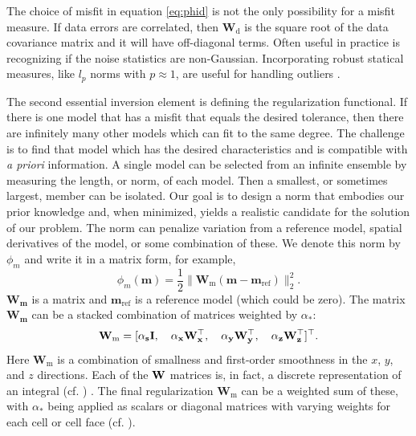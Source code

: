 \documentclass[preprint,review,3p,times,onecolumn,authoryear]{elsarticle}
\newcommand{\m}{\mathbf{m}}
\newcommand{\mref}{\mathbf{m}_\text{ref}}
\newcommand{\Wd}{\mathbf{W}_\text{d}}
\newcommand{\Wm}{\mathbf{W}_\text{m}}
\begin{document}
The choice of misfit in equation \ref{eq:phid} is not the only possibility for a misfit measure.
If data errors are correlated, then $\Wd$ is the square root of the data covariance
matrix and it will have off-diagonal terms. Often useful in practice is recognizing
if the noise statistics are non-Gaussian. Incorporating robust statical measures,
like $l_p$ norms with $p\approx1$, are useful for handling outliers \citep{ekblom1973calculation,Farquharson1998}.

\bigskip

The second essential inversion element is defining the regularization functional.
If there is one model that has a misfit that equals the desired tolerance,
then there are infinitely many other models which can fit to the same
degree. The challenge is to find that model which has the desired characteristics
and is compatible with \emph{a priori} information. A single model can be selected
from an infinite ensemble by measuring the length, or norm, of each model.
Then a smallest, or sometimes largest, member can be isolated. Our goal is to design a norm
that embodies our prior knowledge and, when minimized,
yields a realistic candidate for the solution of our problem. The norm can
penalize variation from a reference model, spatial derivatives of the model, or
some combination of these.
We denote this norm by $\phi_m$ and write it in a matrix form, for example,
{%
\begin{equation}
\label{eq:phim}
\phi_m(\m)= \frac{1}{2}\|\Wm(\m-\mref)\|^2_2.
\end{equation}
}
$\mathbf{W_m}$ is a matrix and $\mref$ is a reference model (which could be zero).
The matrix $\mathbf{W_m}$ can be a stacked combination of matrices weighted by $\alpha_*$:
{%
\begin{equation}
\label{eq:Wm}
    \bf \Wm = [\alpha_s I, \quad \alpha_x W_x^\top, \quad \alpha_y W_y^\top, \quad \alpha_z W_z^\top]^\top.
\end{equation}
}
Here $\Wm$ is a combination of smallness and first-order smoothness in the $x$, $y$, and $z$ directions.
Each of the $\bf W$ matrices is, in fact, a discrete representation of an integral (cf. \cite{DougTutorial}) .
The final regularization $\Wm$ can be a weighted sum of these, with $\alpha_*$ being applied as scalars or diagonal matrices with varying weights for each cell or cell face (cf. \cite{DougTutorial,haber2015computational}).
\end{document}
